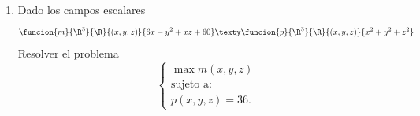 \documentclass[a4,11pt]{aleph-examen}
\begin{document}
\begin{preguntas}
\begin{respuesta}
\begin{respuesta}
\begin{respuesta}
\begin{enumerate}
\begin{respuesta}
    Un ejercicio recomendado para el lector es reemplazar las variables y verificar que al optimizar una función real adecuada, se obtiene la misma respuesta.
\end{respuesta}



\item Dado los campos escalares
    \[
        \funcion{m}{\R^3}{\R}{(x,y,z)}{6x-y^2+xz+60} \texty \funcion{p}{\R^3}{\R}{(x,y,z)}{x^2+y^2+z^2}
    \]
    Resolver el problema
    \[
        \begin{cases}
            \max m(x,y,z)\\
            \text{sujeto  a:}\\
            p(x,y,z)=36.
        \end {cases}
    \]
    

\end{enumerate}
\end{respuesta}
\end{respuesta}
\end{respuesta}
\end{preguntas}
\end{document}
